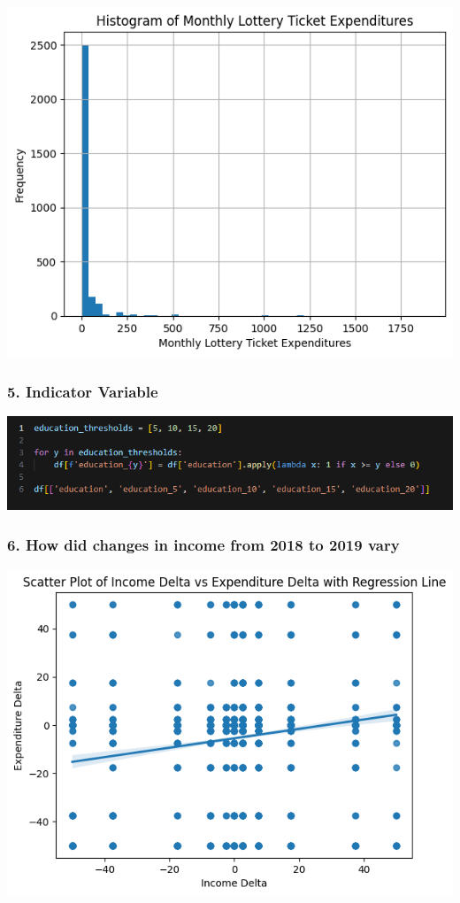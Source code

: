 \documentclass[
  12pt]{article}
\begin{document}
\includegraphics{images/12-02.png}

\subsubsection{5. Indicator Variable}\label{indicator-variable}

\includegraphics{images/13-01.png}

\subsubsection{6. How did changes in income from 2018 to 2019
vary}\label{how-did-changes-in-income-from-2018-to-2019-vary}

\includegraphics{images/16-01.png}
\end{document}
